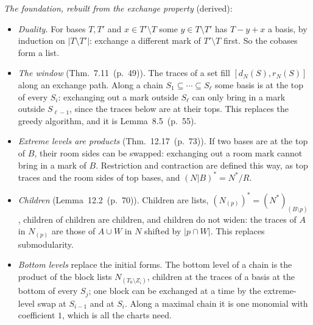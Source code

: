 \documentclass[11pt]{article}
\newcommand{\hb}[2]{#1~(p.~#2)}   %
\theoremstyle{plain}
\theoremstyle{remark}
\begin{document}
\emph{The foundation, rebuilt from the exchange property} (derived):
\begin{itemize}
\item \emph{Duality.} For bases $T,T'$ and $x\in T'\setminus T$ some $y\in T\setminus T'$ has $T-y+x$ a basis, by induction on $|T\setminus T'|$: exchange a different mark of $T'\setminus T$ first. So the cobases form a list.
\item \emph{The window} (Thm.~\hb{7.11}{49}). The traces of a set fill $[d_N(S),r_N(S)]$ along an exchange path. Along a chain $S_1\subseteq\cdots\subseteq S_\ell$ some basis is at the top of every $S_i$: exchanging out a mark outside $S_\ell$ can only bring in a mark outside $S_{\ell-1}$, since the traces below are at their tops. This replaces the greedy algorithm, and it is Lemma~\hb{8.5}{55}.
\item \emph{Extreme levels are products} (Thm.~\hb{12.17}{73}). If two bases are at the top of $B$, their room sides can be swapped: exchanging out a room mark cannot bring in a mark of $B$. Restriction and contraction are defined this way, as top traces and the room sides of top bases, and $(N|B)^\ast=N^\ast/R$.
\item \emph{Children} (Lemma~\hb{12.2}{70}). Children are lists, $(N_{(p)})^\ast=(N^\ast)_{(B\setminus p)}$, children of children are children, and children do not widen: the traces of $A$ in $N_{(p)}$ are those of $A\cup W$ in $N$ shifted by $|p\cap W|$. This replaces submodularity.
\item \emph{Bottom levels} replace the initial forms. The bottom level of a chain is the product of the block lists $N_{(T_0\setminus Z_i)}$, children at the traces of a basis at the bottom of every $S_j$; one block can be exchanged at a time by the extreme-level swap at $S_{i-1}$ and at $S_i$. Along a maximal chain it is one monomial with coefficient $1$, which is all the charts need.
\end{itemize}
\end{document}
